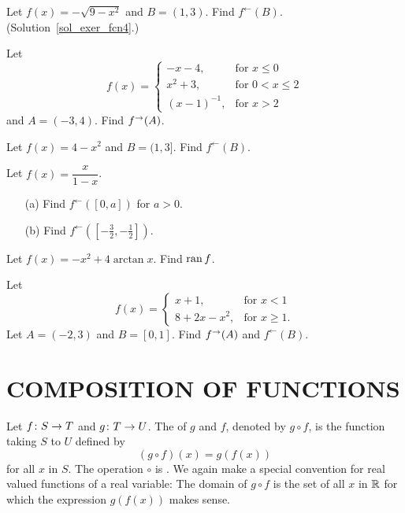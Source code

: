 \begin{exer}\label{exer_fcn4} Let $f(x) = -\sqrt{9 - x^2}$ and $B = (1, 3)$. Find
$f^{\gets}(B)$.  (Solution~\ref{sol_exer_fcn4}.)
\end{exer}

\begin{prob}  Let
 \[f(x) =
      \begin{cases} -x-4, &\text{for $x \le 0$}\\
                  x^2+3,  &\text{for $0 < x \le 2$}\\
             (x-1)^{-1},  &\text{for $x>2$}
     \end{cases}\]
and $A = (-3,4)$.  Find $f^{\rightarrow}(A)$.
\end{prob}

\begin{prob}  Let $f(x) = 4 - x^2$ and $B= (1,3]$.  Find $f^{\gets}(B)$.
\end{prob}

\begin{prob}  Let $f(x) = \dfrac x{1-x}$.
 \begin{enumerate}
  \item[(a)] Find $f^{\gets}([0,a])$  for $a > 0$.
  \item[(b)] Find $f^{\gets}([-\frac32, -\frac12])$.
 \end{enumerate}
\end{prob}

\begin{prob} Let $f(x) = -x^2 + 4\arctan x$. Find $\operatorname{ran} f$.
\end{prob}

\begin{prob} Let
 \[f(x) =
      \begin{cases}  x + 1,  &\text{for $x < 1$}\\
              8 + 2x - x^2,  &\text{for $x \ge 1$}.
      \end{cases}\]
Let $A = (-2, 3)$ and $B = [0,1]$.  Find $f^{\rightarrow}(A)$ and $f^{\gets}(B)$.
\end{prob}







\section{COMPOSITION OF FUNCTIONS}  Let $f \colon S \rightarrow T$ and $g \colon T \rightarrow U$. The
 of $g$ and $f$, denoted by $g \circ f$, is the function taking $S$ to $U$
defined by
 \[(g \circ f)(x) = g(f(x))\]
for all $x$ in $S$.  The operation $\circ$ is
.  We again make a special convention for real valued functions of a real
variable:  The domain of $g \circ f$ is the set of all $x$ in $\mathbb{R}$ for which the expression
$g(f(x))$ makes sense.

